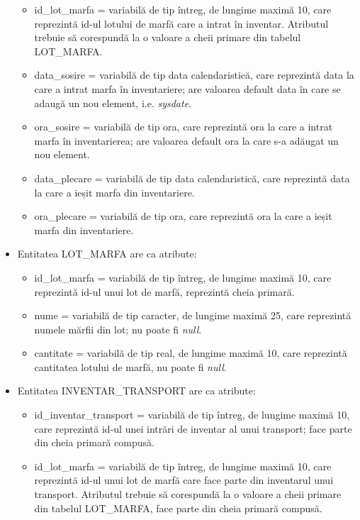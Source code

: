 \documentclass[12pt, a4paper]{article}
\begin{document}
\begin{itemize}
\begin{itemize}
            \item id\_lot\_marfa = variabilă de tip întreg, de lungime maximă 10, care reprezintă id-ul lotului de marfă care a intrat în inventar. Atributul trebuie să corespundă la o valoare a cheii primare din tabelul LOT\_MARFA.
            \item data\_sosire = variabilă de tip data calendaristică, care reprezintă data la care a intrat marfa în inventariere; are valoarea default data în care se adaugă un nou element, i.e. \emph{sysdate}.
            \item ora\_sosire = variabilă de tip ora, care reprezintă ora la care a intrat marfa în inventarierea; are valoarea default ora la care s-a adăugat un nou element.
            \item data\_plecare = variabilă de tip data calendaristică, care reprezintă data la care a ieșit marfa din inventariere.
            \item ora\_plecare = variabilă de tip ora, care reprezintă ora la care a ieșit marfa din inventariere.
        \end{itemize}
    \item Entitatea LOT\_MARFA are ca atribute:
        \begin{itemize}
            \item id\_lot\_marfa = variabilă de tip întreg, de lungime maximă 10, care reprezintă id-ul unui lot de marfă, reprezintă cheia primară.
            \item nume = variabilă de tip caracter, de lungime maximă 25, care reprezintă numele mărfii din lot; nu poate fi \emph{null}.
            \item cantitate = variabilă de tip real, de lungime maximă 10, care reprezintă cantitatea lotului de marfă, nu poate fi \emph{null}.
        \end{itemize}
    \item Entitatea INVENTAR\_TRANSPORT are ca atribute:
        \begin{itemize}
            \item id\_inventar\_transport = variabilă de tip întreg, de lungime maximă 10, care reprezintă id-ul unei intrări de inventar al unui transport; face parte din cheia primară compusă.
            \item id\_lot\_marfa = variabilă de tip întreg, de lungime maximă 10, care reprezintă id-ul unui lot de marfă care face parte din inventarul unui transport. Atributul trebuie să corespundă la o valoare a cheii primare din tabelul LOT\_MARFA, face parte din cheia primară compusă.

\end{itemize}
\end{itemize}
\end{document}

